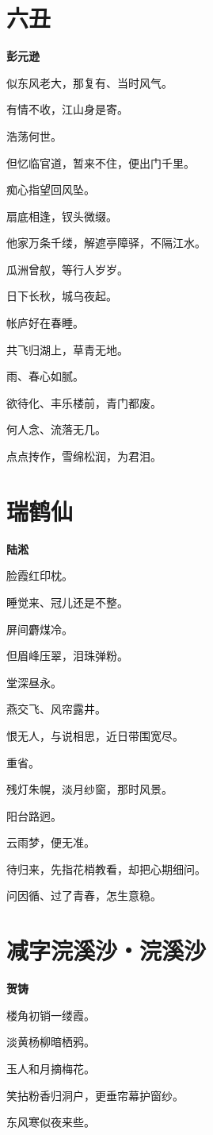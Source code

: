 \documentclass[12pt,a4paper]{ctexbook}
\begin{document}
\section{六丑}
\textbf{彭元逊}\par\vspace{0.5em}
似东风老大，那复有、当时风气。\par
有情不收，江山身是寄。\par
浩荡何世。\par
但忆临官道，暂来不住，便出门千里。\par
痴心指望回风坠。\par
扇底相逢，钗头微缀。\par
他家万条千缕，解遮亭障驿，不隔江水。\par
瓜洲曾舣，等行人岁岁。\par
日下长秋，城乌夜起。\par
帐庐好在春睡。\par
共飞归湖上，草青无地。\par
雨、春心如腻。\par
欲待化、丰乐楼前，青门都废。\par
何人念、流落无几。\par
点点抟作，雪绵松润，为君泪。\par

\section{瑞鹤仙}
\textbf{陆淞}\par\vspace{0.5em}
脸霞红印枕。\par
睡觉来、冠儿还是不整。\par
屏间麝煤冷。\par
但眉峰压翠，泪珠弹粉。\par
堂深昼永。\par
燕交飞、风帘露井。\par
恨无人，与说相思，近日带围宽尽。\par
重省。\par
残灯朱幌，淡月纱窗，那时风景。\par
阳台路迥。\par
云雨梦，便无准。\par
待归来，先指花梢教看，却把心期细问。\par
问因循、过了青春，怎生意稳。\par

\section{减字浣溪沙・浣溪沙}
\textbf{贺铸}\par\vspace{0.5em}
楼角初销一缕霞。\par
淡黄杨柳暗栖鸦。\par
玉人和月摘梅花。\par
笑拈粉香归洞户，更垂帘幕护窗纱。\par
东风寒似夜来些。\par
\end{document}
